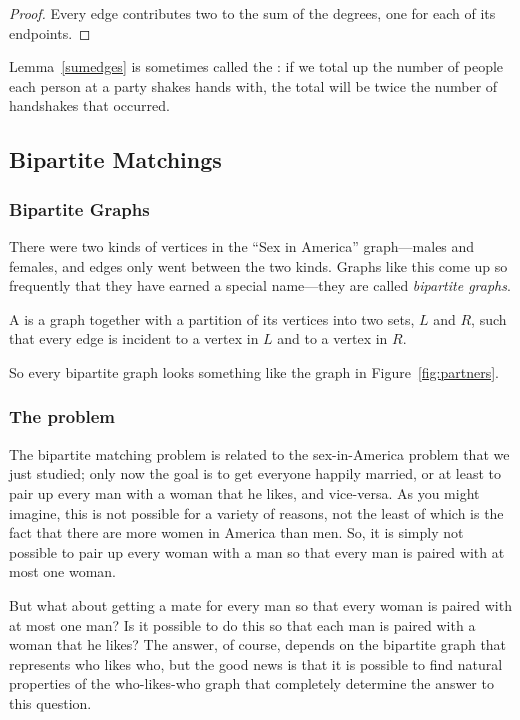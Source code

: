 \begin{proof}
Every edge contributes two to the sum of the degrees, one for each of its endpoints.
\end{proof}

Lemma~\ref{sumedges} is sometimes called the :
if we total up the number of people each person at a party shakes
hands with, the total will be twice the number of handshakes that
occurred.

\subsection{Bipartite Matchings}\label{bipartitesec}

\subsubsection{Bipartite Graphs}\label{bipartitesubsec}

There were two kinds of vertices in the ``Sex in America''
graph---males and females, and edges only went between the two kinds.
Graphs like this come up so frequently that they have earned a special
name---they are called \emph{bipartite graphs}.

\begin{definition}
A  is a graph together with a partition of its
vertices into two sets, $L$ and $R$, such that every edge is incident to a
vertex in $L$ and to a vertex in $R$.
\end{definition}

So every bipartite graph looks something like the graph in
Figure~\ref{fig:partners}.

\subsubsection{The problem}

The bipartite matching problem is related to the sex-in-America
problem that we just studied; only now the goal is to get everyone
happily married, or at least to pair up every man with a woman that he
likes, and vice-versa.  As you might imagine, this is not possible for
a variety of reasons, not the least of which is the fact that there
are more women in America than men.  So, it is simply not possible to
pair up every woman with a man so that every man is paired with at
most one woman.

But what about getting a mate for every man so that every woman is
paired with at most one man?  Is it possible to do this so that each
man is paired with a woman that he likes? The answer, of course,
depends on the bipartite graph that represents who likes who, but the
good news is that it is possible to find natural properties of the
who-likes-who graph that completely determine the answer to this
question.


